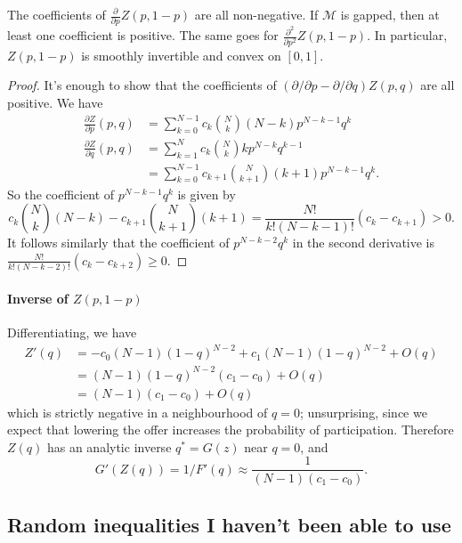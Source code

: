 \begin{lemma}

  The coefficients of $\frac{\partial}{\partial p}Z(p,1-p)$ are all non-negative.
  If $\mathcal{M}$ is gapped, then at least one coefficient is positive.
  The same goes for $\frac{\partial^2}{\partial p^2}Z(p,1-p)$.
  In particular, $Z(p,1-p)$ is smoothly invertible and convex on $[0,1]$.

\end{lemma}
%
\begin{proof}

  It's enough to show that the coefficients of $(\partial/\partial p - \partial/\partial q)Z(p,q)$ are all positive.
  We have
  \begin{align*}
    \frac{\partial Z}{\partial p}(p,q) &= \sum_{k=0}^{N-1} c_k {N \choose k}(N-k)p^{N-k-1}q^k \\
    \frac{\partial Z}{\partial q}(p,q) &= \sum_{k=1}^N c_k {N \choose k}kp^{N-k}q^{k-1} \\
    &= \sum_{k=0}^{N-1} c_{k+1} {N \choose k+1}(k+1) p^{N-k-1}q^{k}.
  \end{align*}
  So the coefficient of $p^{N-k-1}q^k$ is given by
  \[
    c_k {N\choose k}(N-k) - c_{k+1} {N\choose k+1}  (k+1) =  \frac{N!}{k!(N-k-1)!} (c_k-c_{k+1}) > 0. 
  \]
  It follows similarly that the coefficient of $p^{N-k-2}q^k$ in the second derivative is $\frac{N!}{k!(N-k-2)!}(c_k-c_{k+2})\geq 0$.

\end{proof}

\paragraph{Inverse of $Z(p,1-p)$}

Differentiating, we have
\begin{align*}
  Z'(q) &= -c_0(N-1)(1-q)^{N-2} + c_1(N-1)(1-q)^{N-2} + O(q) \\
  &= (N-1)(1-q)^{N-2}(c_1-c_0) + O(q) \\
  &= (N-1)(c_1-c_0) + O(q)
\end{align*}
which is strictly negative in a neighbourhood of $q=0$; unsurprising, since we expect that lowering the offer increases the probability of participation.
%
Therefore $Z(q)$ has an analytic inverse $q^*=G(z)$ near $q=0$, and 
\[
  G'(Z(q)) = 1/F'(q) \approx \frac{1}{(N-1)(c_1-c_0)}.
\]

\subsection{Random inequalities I haven't been able to use}

